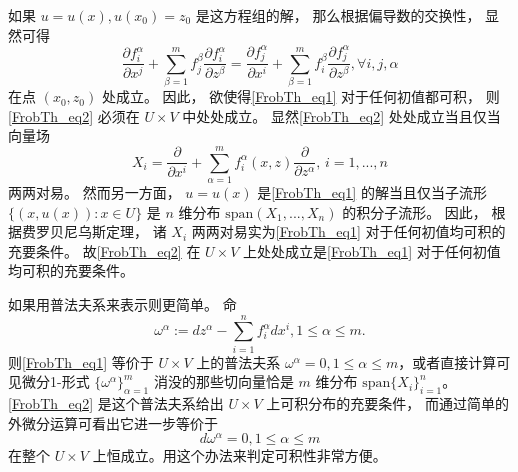如果 $u=u(x),u(x_0)=z_0$ 是这方程组的解， 那么根据偏导数的交换性， 显然可得
\begin{equation}\label{FrobTh_eq2}
\frac{\partial f_i^\alpha}{\partial x^j}+\sum_{\beta=1}^mf_j^\beta\frac{\partial f_i^\alpha}{\partial z^\beta}
=\frac{\partial f_j^\alpha}{\partial x^i}+\sum_{\beta=1}^mf_i^\beta\frac{\partial f_j^\alpha}{\partial z^\beta},\forall i,j,\alpha
\end{equation}
在点 $(x_0,z_0)$ 处成立。 因此， 欲使得\autoref{FrobTh_eq1} 对于任何初值都可积， 则\autoref{FrobTh_eq2} 必须在 $U\times V$ 中处处成立。 显然\autoref{FrobTh_eq2} 处处成立当且仅当向量场
$$
X_i=\frac{\partial}{\partial x^i}+\sum_{\alpha=1}^mf_i^\alpha(x,z)\frac{\partial}{\partial z^\alpha},\,i=1,...,n
$$
两两对易。 然而另一方面， $u=u(x)$ 是\autoref{FrobTh_eq1} 的解当且仅当子流形 $\{(x,u(x)):x\in U\}$ 是 $n$ 维分布 $\text{span}(X_1,...,X_n)$ 的积分子流形。 因此， 根据费罗贝尼乌斯定理， 诸 $X_i$ 两两对易实为\autoref{FrobTh_eq1} 对于任何初值均可积的充要条件。 故\autoref{FrobTh_eq2} 在 $U\times V$ 上处处成立是\autoref{FrobTh_eq1} 对于任何初值均可积的充要条件。

如果用普法夫系来表示则更简单。 命
\begin{equation}\label{FrobTh_eq3}
\omega^\alpha:=dz^\alpha-\sum_{i=1}^nf_i^\alpha dx^i,1\leq\alpha\leq m.
\end{equation}
则\autoref{FrobTh_eq1} 等价于 $U\times V$ 上的普法夫系 $\omega^\alpha=0,1\leq\alpha\leq m$，或者直接计算可见微分1-形式 $\{\omega^\alpha\}_{\alpha=1}^m$ 消没的那些切向量恰是 $m$ 维分布 $\text{span}\{X_i\}_{i=1}^n$。 \autoref{FrobTh_eq2} 是这个普法夫系给出 $U\times V$ 上可积分布的充要条件， 而通过简单的外微分运算可看出它进一步等价于
$$
d\omega^\alpha=0,1\leq\alpha\leq m
$$
在整个 $U\times V$ 上恒成立。用这个办法来判定可积性非常方便。